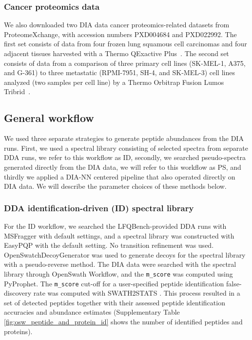 \documentclass[10pt,letterpaper]{article}
\begin{document}
\subsubsection*{Cancer proteomics data}

We also downloaded two DIA data cancer proteomics-related datasets from ProteomeXchange, with accession numbers PXD004684 and PXD022992.  The first set consists of data from four frozen lung squamous cell carcinomas and four adjacent tissues harvested with a Thermo QExactive Plus~\cite{stewart2017relative}. The second set consists of data from a comparison of three primary cell lines (SK-MEL-1, A375, and G-361) to three metastatic (RPMI-7951, SH-4, and SK-MEL-3) cell lines analyzed (two samples per cell line) by a Thermo Orbitrap Fusion Lumos Tribrid~\cite{gao2021data}. 

\subsection*{General workflow}

We used three separate strategies to generate peptide abundances from the DIA runs. First, we used a spectral library consisting of selected spectra from separate DDA runs, we refer to this workflow as ID, secondly, we searched pseudo-spectra generated directly from the DIA data, we will refer to this workflow as PS, and thirdly we applied a DIA-NN centered pipeline that also operated directly on DIA data.  We will describe the parameter choices of these methods below.


\subsubsection*{DDA identification-driven (ID) spectral library}

For the ID workflow, we searched the LFQBench-provided DDA runs with MSFragger\cite{kong2017msfragger} with default settings, and a spectral library was constructed with EasyPQP \cite{easypqp} with the default setting. No transition refinement was used. OpenSwatchDecoyGenerator was used to generate decoys for the spectral library with a pseudo-reverse method. The DIA data were searched with the spectral library through OpenSwath Workflow, and the \texttt{m\_score} was computed using PyProphet\cite{teleman2015diana}. The \texttt{m\_score} cut-off for a user-specified peptide identification false-discovery rate was computed with SWATH2STATS \cite{blattmann2016swath2stats}. This process resulted in a set of detected peptides together with their assessed peptide identification accuracies and abundance estimates (Supplementary Table \ref{fig:osw_peptide_and_protein_id} shows the number of identified peptides and proteins).
\end{document}
